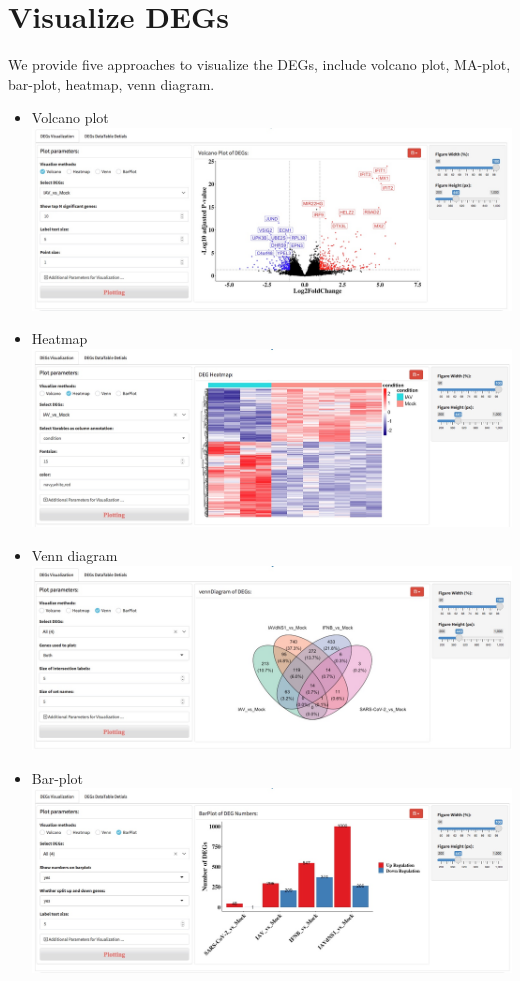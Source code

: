 \documentclass[
  a4paper,
  oneside]{book}
\begin{document}
\hypertarget{visualize-degs}{%
\section{Visualize DEGs}\label{visualize-degs}}

We provide five approaches to visualize the DEGs, include volcano plot, MA-plot, bar-plot, heatmap, venn diagram.

\begin{itemize}
\item
  Volcano plot
  \includegraphics{images/dea-volcano.jpeg}
\item
  Heatmap
  \includegraphics{images/dea-heatmap.jpeg}
\item
  Venn diagram
  \includegraphics{images/dea-venn.jpeg}
\item
  Bar-plot
  \includegraphics{images/dea-bar.jpeg}

\end{itemize}
\end{document}
